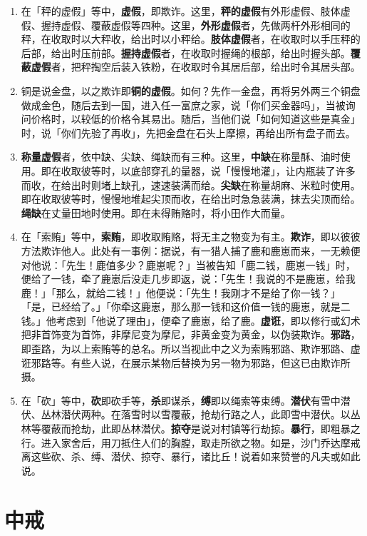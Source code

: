 \begin{enumerate}
\item 在「秤的虚假」等中，\textbf{虚假}，即欺诈。这里，\textbf{秤的虚假}有外形虚假、肢体虚假、握持虚假、覆蔽虚假等四种。这里，\textbf{外形虚假}者，先做两杆外形相同的秤，在收取时以大秤收，给出时以小秤给。\textbf{肢体虚假}者，在收取时以手压秤的后部，给出时压前部。\textbf{握持虚假}者，在收取时握绳的根部，给出时握头部。\textbf{覆蔽虚假}者，把秤掏空后装入铁粉，在收取时令其居后部，给出时令其居头部。
\item 铜是说金盘，以之欺诈即\textbf{铜的虚假}。如何？先作一金盘，再将另外两三个铜盘做成金色，随后去到一国，进入任一富庶之家，说「你们买金器吗」，当被询问价格时，以较低的价格令其易出。随后，当他们说「如何知道这些是真金」时，说「你们先验了再收」，先把金盘在石头上摩擦，再给出所有盘子而去。
\item \textbf{称量虚假}者，依中缺、尖缺、绳缺而有三种。这里，\textbf{中缺}在称量酥、油时使用。即在收取彼等时，以底部穿孔的量器，说「慢慢地灌」，让内瓶装了许多而收，在给出时则堵上缺孔，速速装满而给。\textbf{尖缺}在称量胡麻、米粒时使用。即在收取彼等时，慢慢地堆起尖顶而收，在给出时急急装满，抹去尖顶而给。\textbf{绳缺}在丈量田地时使用。即在未得贿赂时，将小田作大而量。
\item 在「索贿」等中，\textbf{索贿}，即收取贿赂，将无主之物变为有主。\textbf{欺诈}，即以彼彼方法欺诈他人。此处有一事例：据说，有一猎人捕了鹿和鹿崽而来，一无赖便对他说：「先生！鹿值多少？鹿崽呢？」当被告知「鹿二钱，鹿崽一钱」时，便给了一钱，牵了鹿崽后没走几步即返，说：「先生！我说的不是鹿崽，给我鹿！」「那么，就给二钱！」他便说：「先生！我刚才不是给了你一钱？」「是，已经给了。」「你牵这鹿崽，那么那一钱和这价值一钱的鹿崽，就是二钱。」他考虑到「他说了理由」，便牵了鹿崽，给了鹿。\textbf{虚诳}，即以修行或幻术把非首饰变为首饰，非摩尼变为摩尼，非黄金变为黄金，以伪装欺诈。\textbf{邪路}，即歪路，为以上索贿等的总名。所以当视此中之义为索贿邪路、欺诈邪路、虚诳邪路等。有些人说，在展示某物后替换为另一物为邪路，但这已由欺诈所摄。
\item 在「砍」等中，\textbf{砍}即砍手等，\textbf{杀}即谋杀，\textbf{缚}即以绳索等束缚。\textbf{潜伏}有雪中潜伏、丛林潜伏两种。在落雪时以雪覆蔽，抢劫行路之人，此即雪中潜伏。以丛林等覆蔽而抢劫，此即丛林潜伏。\textbf{掠夺}是说对村镇等行劫掠。\textbf{暴行}，即粗暴之行。进入家舍后，用刀抵住人们的胸膛，取走所欲之物。如是，沙门乔达摩戒离这些砍、杀、缚、潜伏、掠夺、暴行，诸比丘！说着如来赞誉的凡夫或如此说。\end{enumerate}

\section{中戒}

